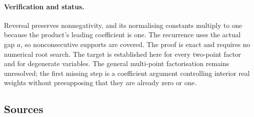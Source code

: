 \documentclass[11pt,a4paper]{article}
\begin{document}
\paragraph{Verification and status.}
Reversal preserves nonnegativity, and its normalising constants multiply to one because the product's leading coefficient is one. The recurrence uses the actual gap $a$, so nonconsecutive supports are covered. The proof is exact and requires no numerical root search. The target is established here for every two-point factor and for degenerate variables. The general multi-point factorisation remains unresolved; the first missing step is a coefficient argument controlling interior real weights without presupposing that they are already zero or one.

\subsection{Sources}
\end{document}
